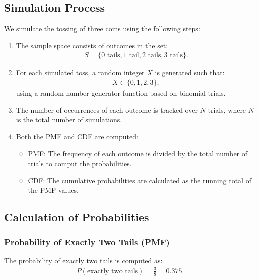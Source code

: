 \documentclass[journal]{IEEEtran}
\begin{document}
\subsection*{Simulation Process}
We simulate the tossing of three coins using the following steps:
\begin{enumerate}
    \item The sample space consists of outcomes in the set:
    \begin{align}
    S = \{0 \text{ tails}, 1 \text{ tail}, 2 \text{ tails}, 3 \text{ tails}\}.
    \end{align}
    \item For each simulated toss, a random integer \( X \) is generated such that:
    \begin{align}
    X \in \{0, 1, 2, 3\},
    \end{align}
    using a random number generator function based on binomial trials.
    \item The number of occurrences of each outcome is tracked over \( N \) trials, where \( N \) is the total number of simulations.
    \item Both the PMF and CDF are computed:
    \begin{itemize}
        \item PMF: The frequency of each outcome is divided by the total number of trials to comput the probabilities.
        \item CDF: The cumulative probabilities are calculated as the running total of the PMF values.
    \end{itemize}
\end{enumerate}

\subsection*{Calculation of Probabilities}
\subsubsection*{Probability of Exactly Two Tails (PMF)}
The probability of exactly two tails is computed as:
\begin{align}
P(\text{exactly two tails}) = \frac{3}{8} = 0.375.
\end{align}
\end{document}
